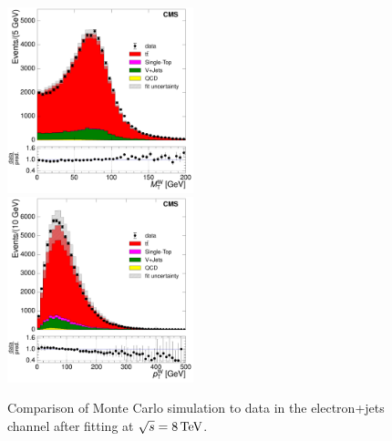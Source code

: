 \begin{figure}[hbtp]
     \includegraphics[width=0.48\textwidth]{Chapters/04_Analysis/04b_XSections/images/control_plots/after_fit/8TeV/EPlusJets_patType1CorrectedPFMet_MT_2orMoreBtags_with_ratio.pdf}\\     
	 \includegraphics[width=0.48\textwidth]{Chapters/04_Analysis/04b_XSections/images/control_plots/after_fit/8TeV/EPlusJets_patType1CorrectedPFMet_WPT_2orMoreBtags_with_ratio.pdf}\hfill
	 \caption[Comparison of Monte Carlo simulation to data in the electron+jets channel after fitting at
	 $\roots=8\TeV$.]{Comparison of Monte Carlo simulation to data in the electron+jets channel after fitting at
	 $\roots=8\TeV$.}
     \label{fig:data_mc_comparison_after_fit_8TeV_electron}
\end{figure}


